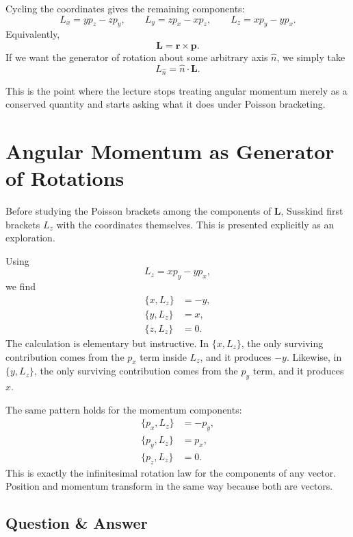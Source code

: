Cycling the coordinates gives the remaining components:
\begin{equation}
L_x=yp_z-zp_y,\qquad
L_y=zp_x-xp_z,\qquad
L_z=xp_y-yp_x.
\end{equation}
Equivalently,
\begin{equation}
\mathbf L=\mathbf r\times \mathbf p.
\end{equation}
If we want the generator of rotation about some arbitrary axis \(\hat n\), we simply take
\begin{equation}
L_{\hat n}=\hat n\cdot \mathbf L.
\end{equation}

This is the point where the lecture stops treating angular momentum merely as a conserved quantity and starts asking what it does under Poisson bracketing.

\section{Angular Momentum as Generator of Rotations}

Before studying the Poisson brackets among the components of \(\mathbf L\), Susskind first brackets \(L_z\) with the coordinates themselves. This is presented explicitly as an exploration.

Using
\[
L_z=xp_y-yp_x,
\]
we find
\begin{align}
\{x,L_z\}&=-y,\\
\{y,L_z\}&=x,\\
\{z,L_z\}&=0.
\end{align}
The calculation is elementary but instructive. In \(\{x,L_z\}\), the only surviving contribution comes from the \(p_x\) term inside \(L_z\), and it produces \(-y\). Likewise, in \(\{y,L_z\}\), the only surviving contribution comes from the \(p_y\) term, and it produces \(x\).

The same pattern holds for the momentum components:
\begin{align}
\{p_x,L_z\}&=-p_y,\\
\{p_y,L_z\}&=p_x,\\
\{p_z,L_z\}&=0.
\end{align}
This is exactly the infinitesimal rotation law for the components of any vector. Position and momentum transform in the same way because both are vectors.

\subsection{Question \& Answer}

